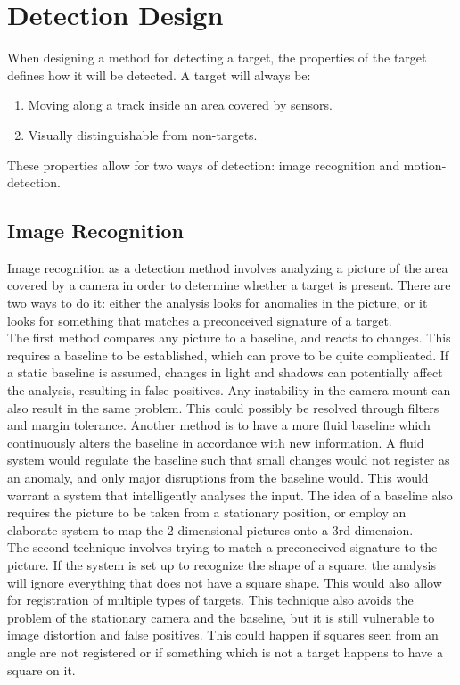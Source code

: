 \section{Detection Design}
When designing a method for detecting a target, the properties of the target defines how it will be detected. A target will always be:

\begin{enumerate}
\item Moving along a track inside an area covered by sensors.
\item Visually distinguishable from non-targets.
\end{enumerate}

These properties allow for two ways of detection: image recognition and motion-detection.

\subsection{Image Recognition}
Image recognition as a detection method involves analyzing a picture of the area covered by a camera in order to determine whether a target is present. There are two ways to do it: either the analysis looks for anomalies in the picture, or it looks for something that matches a preconceived signature of a target. \\

The first method compares any picture to a baseline, and reacts to changes. This requires a baseline to be established, which can prove to be quite complicated. If a static baseline is assumed, changes in light and shadows can potentially affect the analysis, resulting in false positives. Any instability in the camera mount can also result in the same problem. This could possibly be resolved through filters and margin tolerance. Another method is to have a more fluid baseline which continuously alters the baseline in accordance with new information. A fluid system would regulate the baseline such that small changes would not register as an anomaly, and only major disruptions from the baseline would. This would warrant a system that intelligently analyses the input. The idea of a baseline also requires the picture to be taken from a stationary position, or employ an elaborate system to map the 2-dimensional pictures onto a 3rd dimension. \\

The second technique involves trying to match a preconceived signature to the picture. If the system is set up to recognize the shape of a square, the analysis will ignore everything that does not have a square shape. This would also allow for registration of multiple types of targets. This technique also avoids the problem of the stationary camera and the baseline, but it is still vulnerable to image distortion and false positives. This could happen if squares seen from an angle are not registered or if something which is not a target happens to have a square on it.



